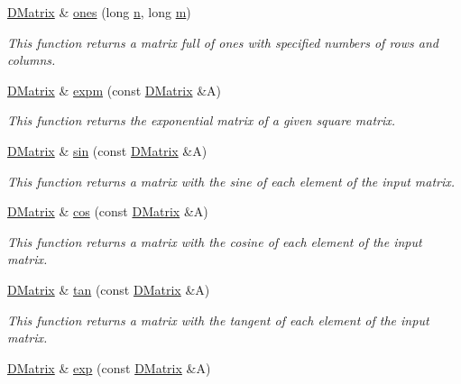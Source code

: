 \begin{DoxyCompactItemize}
\hyperlink{classDMatrix}{DMatrix} \& \hyperlink{classDMatrix_ad90074f7636d5a5a80de596f210b398c}{ones} (long \hyperlink{classDMatrix_a6b7668991ff7d01230b3599836a5d682}{n}, long \hyperlink{classDMatrix_a9cb55e3ad06f81025fed1ffbb0ae28bd}{m})
\begin{DoxyCompactList}\small\item\em This function returns a matrix full of ones with specified numbers of rows and columns. \item\end{DoxyCompactList}\item 
\hyperlink{classDMatrix}{DMatrix} \& \hyperlink{classDMatrix_a0cbd806dab65e5458cb5ad832615c506}{expm} (const \hyperlink{classDMatrix}{DMatrix} \&A)
\begin{DoxyCompactList}\small\item\em This function returns the exponential matrix of a given square matrix. \item\end{DoxyCompactList}\item 
\hyperlink{classDMatrix}{DMatrix} \& \hyperlink{classDMatrix_ad7d82c1616fcc97e403e50a5066ec851}{sin} (const \hyperlink{classDMatrix}{DMatrix} \&A)
\begin{DoxyCompactList}\small\item\em This function returns a matrix with the sine of each element of the input matrix. \item\end{DoxyCompactList}\item 
\hyperlink{classDMatrix}{DMatrix} \& \hyperlink{classDMatrix_aa9e07c7b8674a182891bfaf4699906b9}{cos} (const \hyperlink{classDMatrix}{DMatrix} \&A)
\begin{DoxyCompactList}\small\item\em This function returns a matrix with the cosine of each element of the input matrix. \item\end{DoxyCompactList}\item 
\hyperlink{classDMatrix}{DMatrix} \& \hyperlink{classDMatrix_a60601de2de5f8d857668cca1cea050e5}{tan} (const \hyperlink{classDMatrix}{DMatrix} \&A)
\begin{DoxyCompactList}\small\item\em This function returns a matrix with the tangent of each element of the input matrix. \item\end{DoxyCompactList}\item 
\hyperlink{classDMatrix}{DMatrix} \& \hyperlink{classDMatrix_a16013e5264442d52b6d98a4a49fee29f}{exp} (const \hyperlink{classDMatrix}{DMatrix} \&A)

\end{DoxyCompactItemize}
